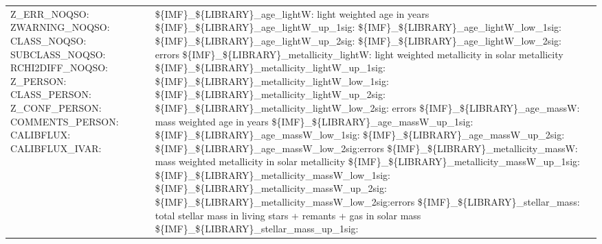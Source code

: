 \documentclass[onecolumn]{aa}
\begin{document}
\begin{table}
\begin{center}
\begin{tabular}{ L{3.5cm} L{4cm} L{11cm} }
Z\_ERR\_NOQSO:  \newline 
ZWARNING\_NOQSO:  \newline 
CLASS\_NOQSO:  \newline 
SUBCLASS\_NOQSO:  \newline 
RCHI2DIFF\_NOQSO:  \newline 
Z\_PERSON:  \newline 
CLASS\_PERSON:  \newline 
Z\_CONF\_PERSON:  \newline 
COMMENTS\_PERSON:  \newline 
CALIBFLUX:  \newline 
CALIBFLUX\_IVAR:  \newline 
 
& 

\$\{IMF\}\_\$\{LIBRARY\}\_age\_lightW: light weighted age in years \newline 
\$\{IMF\}\_\$\{LIBRARY\}\_age\_lightW\_up\_1sig:  
\$\{IMF\}\_\$\{LIBRARY\}\_age\_lightW\_low\_1sig: 
\$\{IMF\}\_\$\{LIBRARY\}\_age\_lightW\_up\_2sig:  
\$\{IMF\}\_\$\{LIBRARY\}\_age\_lightW\_low\_2sig: errors \newline 
\$\{IMF\}\_\$\{LIBRARY\}\_metallicity\_lightW: light weighted metallicity in solar metallicity \newline 
\$\{IMF\}\_\$\{LIBRARY\}\_metallicity\_lightW\_up\_1sig:  
\$\{IMF\}\_\$\{LIBRARY\}\_metallicity\_lightW\_low\_1sig:  
\$\{IMF\}\_\$\{LIBRARY\}\_metallicity\_lightW\_up\_2sig:  
\$\{IMF\}\_\$\{LIBRARY\}\_metallicity\_lightW\_low\_2sig: errors \newline 
\$\{IMF\}\_\$\{LIBRARY\}\_age\_massW: mass weighted age in years \newline 
\$\{IMF\}\_\$\{LIBRARY\}\_age\_massW\_up\_1sig: 
\$\{IMF\}\_\$\{LIBRARY\}\_age\_massW\_low\_1sig:
\$\{IMF\}\_\$\{LIBRARY\}\_age\_massW\_up\_2sig: 
\$\{IMF\}\_\$\{LIBRARY\}\_age\_massW\_low\_2sig:errors \newline 
\$\{IMF\}\_\$\{LIBRARY\}\_metallicity\_massW: mass weighted metallicity in solar metallicity \newline 
\$\{IMF\}\_\$\{LIBRARY\}\_metallicity\_massW\_up\_1sig: 
\$\{IMF\}\_\$\{LIBRARY\}\_metallicity\_massW\_low\_1sig: 
\$\{IMF\}\_\$\{LIBRARY\}\_metallicity\_massW\_up\_2sig: 
\$\{IMF\}\_\$\{LIBRARY\}\_metallicity\_massW\_low\_2sig:errors \newline 
\$\{IMF\}\_\$\{LIBRARY\}\_stellar\_mass: total stellar mass in living stars + remants + gas in solar mass \newline 
\$\{IMF\}\_\$\{LIBRARY\}\_stellar\_mass\_up\_1sig: 

\end{tabular}
\end{center}
\end{table}
\end{document}
